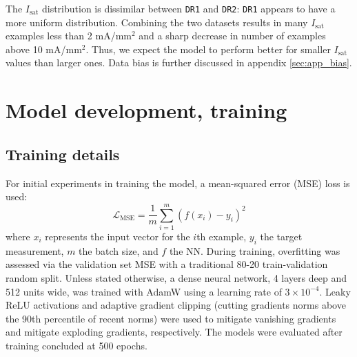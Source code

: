 The $I_\text{sat}$ distribution is dissimilar between \texttt{DR1} and \texttt{DR2}: \texttt{DR1} appears to have a more uniform distribution. Combining the two datasets results in many $I_\text{sat}$ examples less than 2 mA/mm$^2$ and a sharp decrease in number of examples above 10 mA/mm$^2$. Thus, we expect the model to perform better for smaller $I_\text{sat}$ values than larger ones. Data bias is further discussed in appendix \ref{sec:app_bias}.



\section{Model development, training}
\label{sec:model_dev}

\subsection{Training details}

For initial experiments in training the model, a mean-squared error (MSE) loss is used:
\begin{equation}
	\mathcal{L}_\text{MSE}=\frac{1}{m}\sum_{i=1}^m \left(f\left(x_i\right) - y_i \right)^2
\end{equation} 
where $x_i$ represents the input vector for the $i$th example, $y_i$ the target measurement, $m$ the batch size, and $f$ the NN. During training, overfitting was assessed via the validation set MSE with a traditional 80-20 train-validation random split. Unless stated otherwise, a dense neural network, 4 layers deep and 512 units wide, was trained with AdamW using a learning rate of $3\times10^{-4}$. Leaky ReLU activations and adaptive gradient clipping\cite{seetharaman_autoclip_2020} (cutting gradients norms above the 90th percentile of recent norms) were used to mitigate vanishing gradients and mitigate exploding gradients, respectively. The models were evaluated after training concluded at 500 epochs.

